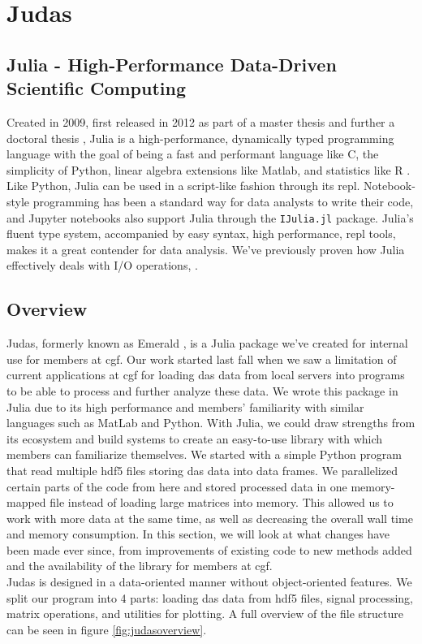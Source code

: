 \section{Judas}
\label{met:Judas}

\subsection{Julia - High-Performance Data-Driven Scientific Computing}

Created in 2009, first released in 2012 as part of a master thesis \cite{juliaMs} and further a doctoral thesis \cite{juliaPHD}, Julia is a high-performance, dynamically typed programming language with the goal of being a fast and performant language like C, the simplicity of Python, linear algebra extensions like Matlab, and statistics like R \cite{julia}. Like Python, Julia can be used in a script-like fashion through its \acrfull{repl}. Notebook-style programming has been a standard way for data analysts to write their code, and Jupyter notebooks also support Julia through the \texttt{IJulia.jl} package. 
Julia's fluent type system, accompanied by easy syntax, high performance, \acrshort{repl} tools, makes it a great contender for data analysis. We've previously proven how Julia effectively deals with I/O operations, \cite{projthesis}.

\subsection{Overview}

Judas, formerly known as Emerald \cite{projthesis}, is a Julia package we've created for internal use for members at \acrshort{cgf}. Our work started last fall when we saw a limitation of current applications at \acrshort{cgf} for loading \acrshort{das} data from local servers into programs to be able to process and further analyze these data. We wrote this package in Julia due to its high performance and members' familiarity with similar languages such as MatLab and Python. With Julia, we could draw strengths from its ecosystem and build systems to create an easy-to-use library with which members can familiarize themselves. We started with a simple Python program that read multiple \acrshort{hdf5} files storing \acrshort{das} data into data frames. We parallelized certain parts of the code from here and stored processed data in one memory-mapped file instead of loading large matrices into memory. This allowed us to work with more data at the same time, as well as decreasing the overall wall time and memory consumption.  
In this section, we will look at what changes have been made ever since, from improvements of existing code to new methods added and the availability of the library for members at \acrshort{cgf}. \\
Judas is designed in a data-oriented manner without object-oriented features. We split our program into 4 parts: loading \acrshort{das} data from \acrshort{hdf5} files, signal processing, matrix operations, and utilities for plotting. A full overview of the file structure can be seen in figure \ref{fig:judasoverview}.\\

